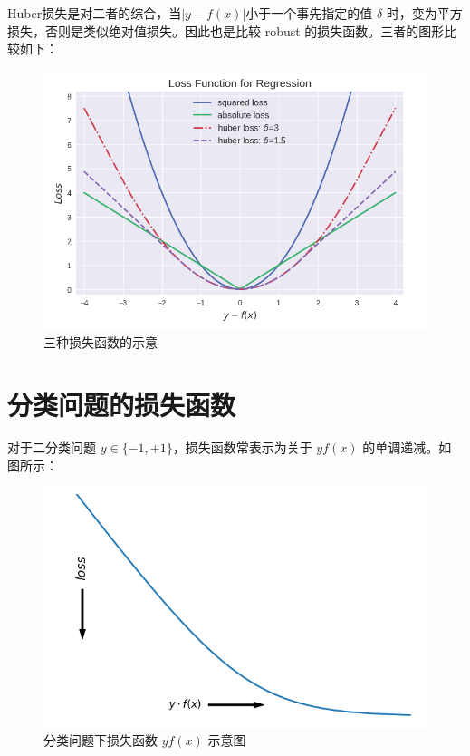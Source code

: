 \documentclass[12pt]{article}
\begin{document}
Huber损失是对二者的综合，当$|y-f(x)|$小于一个事先指定的值 $\delta$ 时，变为平方损失，否则是类似绝对值损失。因此也是比较 robust 的损失函数。三者的图形比较如下：
\begin{figure}[ht]
  \centering
  \includegraphics[width=.8\textwidth]{fig/SqureLoss_AbsoluteLoss_HuberLoss_Example.png} %
  \caption{三种损失函数的示意} %
  \label{SqureLoss_AbsoluteLoss_HuberLoss_Example} %
\end{figure}

\section{分类问题的损失函数}
对于二分类问题 $y\in\{-1,+1\}$，损失函数常表示为关于 $yf(x)$ 的单调递减。如图所示：
\begin{figure}[ht]
  \centering
  \includegraphics[width=.8\textwidth]{fig/Classification_yfx_example.png} %
  \caption{分类问题下损失函数 $yf(x)$ 示意图} %
  \label{Classification_yfx_example} %
\end{figure}
\end{document}
